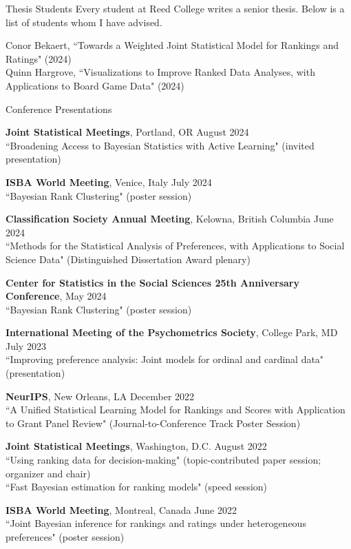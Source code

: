 \documentclass{resume} %
\begin{document}
\begin{rSection}{Thesis Students}
Every student at Reed College writes a senior thesis. Below is a list of students whom I have advised.

Conor Bekaert, ``Towards a Weighted Joint Statistical Model for Rankings and Ratings" (2024)
\\ Quinn Hargrove, ``Visualizations to Improve Ranked Data Analyses, with Applications to Board Game Data" (2024)

\end{rSection}

\begin{rSection}{Conference Presentations}

\textbf{Joint Statistical Meetings}, Portland, OR \hfill {August 2024}\\
``Broadening Access to Bayesian Statistics with Active Learning" (invited presentation)

\textbf{ISBA World Meeting}, Venice, Italy \hfill {July 2024}\\
``Bayesian Rank Clustering" (poster session)

\textbf{Classification Society Annual Meeting}, Kelowna, British Columbia \hfill{June 2024}\\
``Methods for the Statistical Analysis of Preferences, with Applications to Social Science Data" (Distinguished Dissertation Award plenary)

\textbf{Center for Statistics in the Social Sciences 25th Anniversary Conference},  \hfill {May 2024}\\
``Bayesian Rank Clustering" (poster session)

\textbf{International Meeting of the Psychometrics Society}, College Park, MD \hfill{July 2023}\\
``Improving preference analysis: Joint models for ordinal and cardinal data" (presentation)

\textbf{NeurIPS}, New Orleans, LA \hfill {December 2022}\\
``A Unified Statistical Learning Model for Rankings and Scores with Application to Grant Panel Review" (Journal-to-Conference Track Poster Session)

\textbf{Joint Statistical Meetings}, Washington, D.C. \hfill {August 2022}\\
``Using ranking data for decision-making" (topic-contributed paper session; organizer and chair)\\
``Fast Bayesian estimation for ranking models" (speed session)

\textbf{ISBA World Meeting}, Montreal, Canada \hfill {June 2022}\\
``Joint Bayesian inference for rankings and ratings under heterogeneous preferences" (poster session)


\end{rSection}
\end{document}
